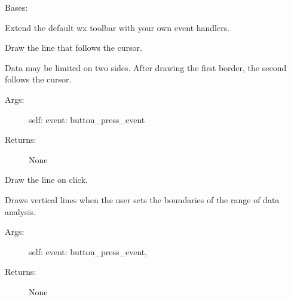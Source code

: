 \documentclass[letterpaper,10pt,english]{sphinxmanual}
\begin{document}
\begin{fulllineitems}
\label{\detokenize{GUI:GUI.MyNavigationToolbar}}
Bases: 

Extend the default wx toolbar with your own event handlers.

\begin{fulllineitems}
\label{\detokenize{GUI:GUI.MyNavigationToolbar.on_curser}}
Draw the line that follows the cursor.

Data may be limited on two sides. After drawing the first border, the second follows the cursor.
\begin{description}
\item[{Args:}] \leavevmode
self:
event: button\_press\_event

\item[{Returns:}] \leavevmode
None

\end{description}

\end{fulllineitems}


\begin{fulllineitems}
\label{\detokenize{GUI:GUI.MyNavigationToolbar.on_press}}
Draw the line on click.

Draws vertical lines when the user sets the boundaries of the range of data analysis.
\begin{description}
\item[{Args:}] \leavevmode
self:
event: button\_press\_event,

\item[{Returns:}] \leavevmode
None

\end{description}

\end{fulllineitems}


\end{fulllineitems}
\end{document}

